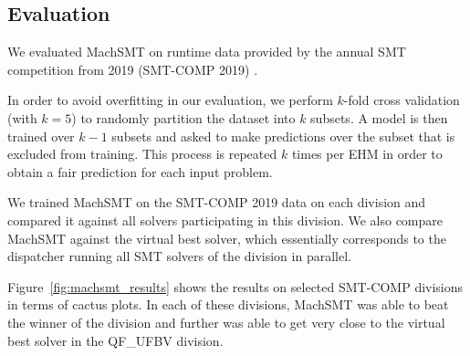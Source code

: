 \documentclass{article}
\begin{document}
\subsection{Evaluation}

We evaluated MachSMT on runtime data provided by the annual SMT competition
from 2019 (SMT-COMP 2019) \cite{smtcomp2019}.

In order to avoid overfitting in our evaluation, we perform $k$-fold cross
validation (with $k = 5$) to randomly partition the dataset into $k$ subsets.
A model is then trained over $k - 1$ subsets and asked to make predictions over
the subset that is excluded from training.
This process is repeated $k$ times per EHM in order to obtain a fair prediction
for each input problem.

We trained MachSMT on the SMT-COMP 2019 data on each division and compared
it against all solvers participating in this division.
We also compare MachSMT against the virtual best solver, which essentially
corresponds to the dispatcher running all SMT solvers of the division in
parallel.

Figure~\ref{fig:machsmt_results} shows the results on selected SMT-COMP
divisions in terms of cactus plots.
In each of these divisions, MachSMT was able to beat the winner of the division
and further was able to get very close to the virtual best solver in the
QF\_UFBV division.
\end{document}
